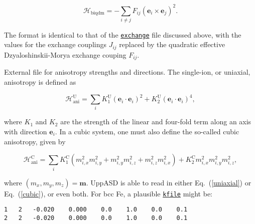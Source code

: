 \documentclass[11pt,fleqn,a4]{book} %
\makeatletter
\newcommand{\litem}[1]{\item[\bfseries#1\index{#1@\texttt{#1}}\label{#1}]}
\newcommand{\rkeyword}[1]{\hyperref[#1]{\texttt{#1}}}
\newcommand{\rfilename}[1]{\hyperref[#1]{\texttt{#1}}}
\makeatother
\begin{document}
\begin{description}[leftmargin=!,labelwidth=\widthof{\bfseries fifteenchars}]
\begin{declaration}
\begin{equation}
 \mathcal{H}_{\mathrm{biqdm}} = -\sum_{i\neq j}F_{ij} \left( \mathbf{e}_i\times\mathbf{e}_j \right)^2.
  \label{biqdm_ham}
\end{equation}
\end{declaration}

\noindent The format is identical to that of the \rkeyword{exchange} file discussed above, with the values for the exchange couplings $J_{ij}$ replaced by the quadratic effective Dzyaloshinskii-Morya exchange couping $F_{ij}$. 

\litem{anisotropy}\label{kfile} External file for anisotropy strengths and directions. The single-ion, or uniaxial, anisotropy is defined as

\begin{declaration} 
\begin{equation}
  \mathcal{H}^{\mathrm{U}}_{\mathrm{ani}} = \sum_i K_1^{\mathrm{U}} (\mathbf{e}_i\cdot\mathbf{e}_i)^2 + K_2^{\mathrm{U}} (\mathbf{e}_i\cdot\mathbf{e}_i)^4,
\label{uniaxial}
\end{equation}
\end{declaration}

where $K_1$ and $K_2$ are the strength of the linear and four-fold term along an axis with direction $\mathbf{e}_i$. In a cubic system, one must also define the so-called cubic anisotropy, given by

\begin{declaration}
\begin{equation}
  \mathcal{H}^{\mathrm{C}}_{\mathrm{ani}} = \sum_i K_1^{\mathrm{C}} (m_{i,x}^2m_{i,y}^2 + m_{i,y}^2m_{i,z}^2 + m_{i,z}^2m_{i,x}^2 ) + K_2^{\mathrm{C}} m_{i,x}^2 m_{i,y}^2 m_{i,z}^2,
\label{cubic}
\end{equation}
\end{declaration}

where $ (m_x, m_y, m_z)=\mathbf{m}$. UppASD is able to read in either Eq.~(\ref{uniaxial}) or Eq.~(\ref{cubic}), or even both. For bcc Fe, a plausible \rfilename{kfile} might be:

\begin{fBox} 
\begin{verbatim}
1   2   -0.020    0.000    0.0    1.0    0.0    0.1 
2   2   -0.020    0.000    0.0    1.0    0.0    0.1    
\end{verbatim}
\end{fBox}


\end{description}
\end{document}
